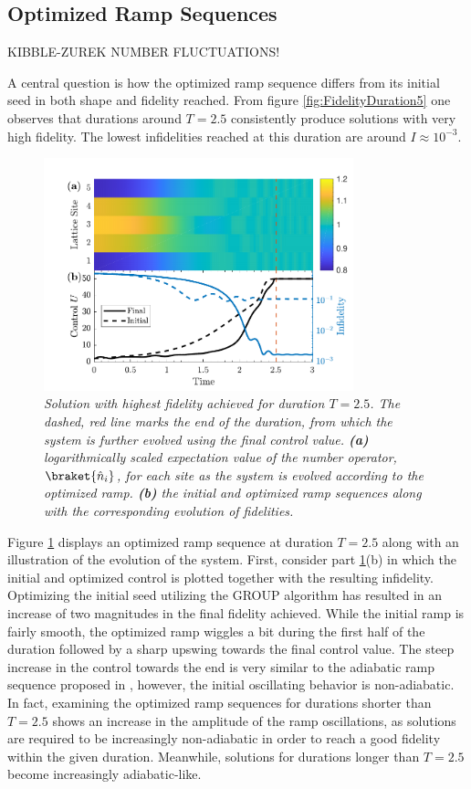 \subsection{Optimized Ramp Sequences}

KIBBLE-ZUREK NUMBER FLUCTUATIONS!

A central question is how the optimized ramp sequence differs from its initial seed in both shape and fidelity reached. From figure \ref{fig:FidelityDuration5} one observes that durations around $T = 2.5$ consistently produce solutions with very high fidelity. The lowest infidelities reached at this duration are around $I \approx 10^{-3}$. 
\begin{figure}[h!]
    \centering
    \includegraphics[width=0.8\textwidth]{Figures/5part/ExtendedRampT25.pdf}
    \caption{\textit{Solution with highest fidelity achieved for duration $T = 2.5$. The dashed, red line marks the end of the duration, from which the system is further evolved using the final control value. \textbf{(a)} logarithmically scaled expectation value of the number operator, $\braket{\hat{n}_i}$, for each site as the system is evolved according to the optimized ramp. \textbf{(b)} the initial and optimized ramp sequences along with the corresponding evolution of fidelities.}}
    \label{fig:ExtendedRamp5}
\end{figure}
Figure \ref{fig:ExtendedRamp5} displays an optimized ramp sequence at duration $T = 2.5$ along with an illustration of the evolution of the system. First, consider part \ref{fig:ExtendedRamp5}(b) in which the initial and optimized control is plotted together with the resulting infidelity. Optimizing the initial seed utilizing the GROUP algorithm has resulted in an increase of two magnitudes in the final fidelity achieved.
While the initial ramp is fairly smooth, the optimized ramp wiggles a bit during the first half of the duration followed by a sharp upswing towards the final control value. The steep increase in the control towards the end is very similar to the adiabatic ramp sequence proposed in \cite{Zakrzewski2009}, however, the initial oscillating behavior is non-adiabatic. In fact, examining the optimized ramp sequences for durations shorter than $T = 2.5$ shows an increase in the amplitude of the ramp oscillations, as solutions are required to be increasingly non-adiabatic in order to reach a good fidelity within the given duration. Meanwhile, solutions for durations longer than $T = 2.5$ become increasingly adiabatic-like.\\
